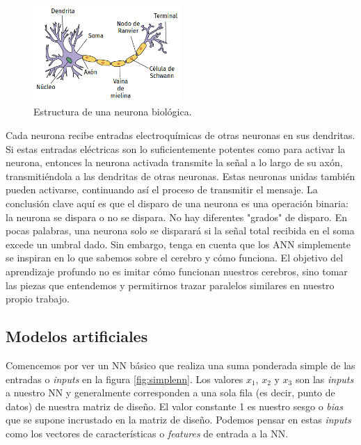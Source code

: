 \documentclass[a4paper,12pt]{article}
\begin{document}
\begin{figure}[H]
	\begin{center}				
		\includegraphics[width=0.5\textwidth]{019.png}
		\caption{Estructura de una neurona biológica. \citep{neurona_wiki}}
		\label{fig:realneuron}
	\end{center}
\end{figure}

Cada neurona recibe entradas electroquímicas de otras neuronas en sus dendritas. Si estas entradas eléctricas son lo suficientemente potentes como para activar la neurona, entonces la neurona activada transmite la señal a lo largo de su axón, transmitiéndola a las dendritas de otras neuronas. Estas neuronas unidas también pueden activarse, continuando así el proceso de transmitir el mensaje.
La conclusión clave aquí es que el disparo de una neurona es una operación binaria: la neurona se dispara o no se dispara. No hay diferentes "grados" de disparo. En pocas palabras, una neurona solo se disparará si la señal total recibida en el soma excede un umbral dado.
Sin embargo, tenga en cuenta que los ANN simplemente se inspiran en lo que sabemos sobre el cerebro y cómo funciona. El objetivo del aprendizaje profundo no es imitar cómo funcionan nuestros cerebros, sino tomar las piezas que entendemos y permitirnos trazar paralelos similares en nuestro propio trabajo.

\subsection{Modelos artificiales}
Comencemos por ver un NN básico que realiza una suma ponderada simple de las entradas o \textit{inputs} en la figura \ref{fig:simplenn}. Los valores $x_1$, $x_2$ y $x_3$ son las \textit{inputs} a nuestro NN y generalmente corresponden a una sola fila (es decir, punto de datos) de nuestra matriz de diseño. El valor constante 1 es nuestro sesgo o \textit{bias} que se supone incrustado en la matriz de diseño. Podemos pensar en estas \textit{inputs} como los vectores de características o \textit{features} de entrada a la NN.
\end{document}
